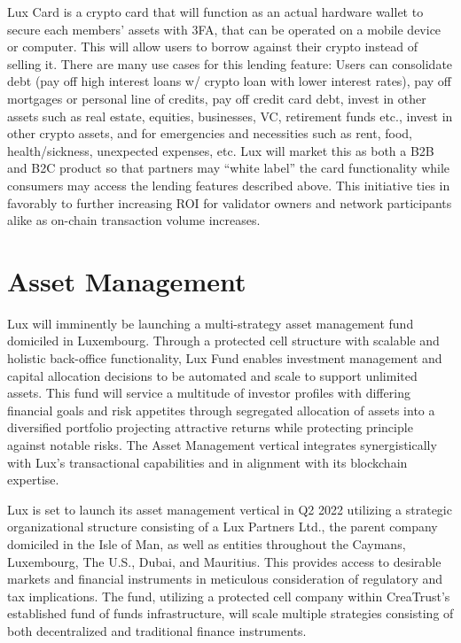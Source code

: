 \documentclass[11pt]{article}
\begin{document}
Lux Card is a crypto card that will function as an actual hardware wallet to secure each members' assets with 3FA, that can be operated on a mobile device or computer. This will allow users to borrow against their crypto instead of selling it. There are many use cases for this lending feature: Users can consolidate debt (pay off high interest loans w/ crypto loan with lower interest rates), pay off mortgages or personal line of credits, pay off credit card debt, invest in other assets such as real estate, equities, businesses, VC, retirement funds etc., invest in other crypto assets, and for emergencies and necessities such as rent, food, health/sickness, unexpected expenses, etc. Lux will market this as both a B2B and B2C product so that partners may ``white label'' the card functionality while consumers may access the lending features described above. This initiative ties in favorably to further increasing ROI for validator owners and network participants alike as on-chain transaction volume increases.


\section{Asset Management}

Lux will imminently be launching a multi-strategy asset management fund domiciled in Luxembourg. Through a protected cell structure with scalable and holistic back-office functionality, Lux Fund enables investment management and capital allocation decisions to be automated and scale to support unlimited assets. This fund will service a multitude of investor profiles with differing financial goals and risk appetites through segregated allocation of assets into a diversified portfolio projecting attractive returns while protecting principle against notable risks. The Asset Management vertical integrates synergistically with Lux's transactional capabilities and in alignment with its blockchain expertise.


Lux is set to launch its asset management vertical in Q2 2022 utilizing a strategic organizational structure consisting of a Lux Partners Ltd., the parent company domiciled in the Isle of Man, as well as entities throughout the Caymans, Luxembourg, The U.S., Dubai, and Mauritius. This provides access to desirable markets and financial instruments in meticulous consideration of regulatory and tax implications. The fund, utilizing a protected cell company within CreaTrust's established fund of funds infrastructure, will scale multiple strategies consisting of both decentralized and traditional finance instruments.
\end{document}
